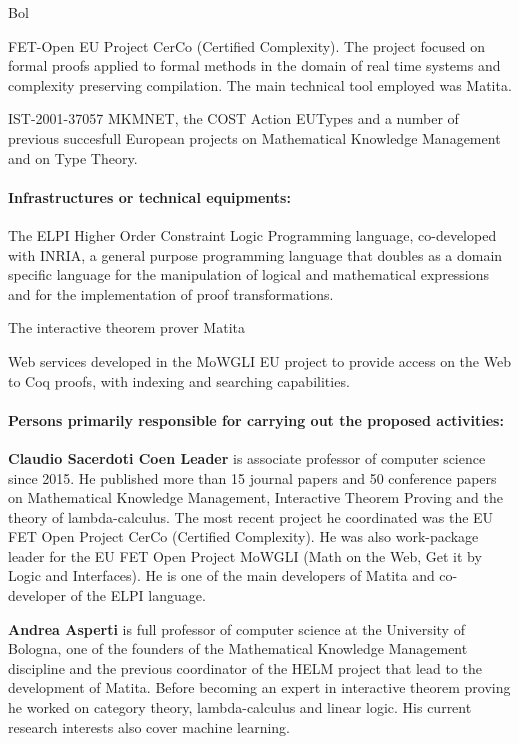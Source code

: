 \begin{sitedescription}{Bol}
\begin{compactitem}
\item FET-Open EU Project CerCo (Certified Complexity). The project focused on formal proofs applied to formal methods in the domain of real time systems and complexity preserving compilation. The main technical tool employed was Matita.

\item IST-2001-37057 MKMNET, the COST Action EUTypes and a number of previous succesfull European projects on Mathematical Knowledge Management and on Type Theory.
\end{compactitem}

\paragraph*{Infrastructures or technical equipments:}

\begin{compactitem}
\item The ELPI Higher Order Constraint Logic Programming language, co-developed with INRIA, a general purpose programming language that doubles as a domain specific language for the manipulation of logical and mathematical expressions and for the implementation of proof transformations.
\item The interactive theorem prover Matita
\item Web services developed in the MoWGLI EU project to provide access on the Web to Coq proofs, with indexing and searching capabilities.
\end{compactitem}

\paragraph*{Persons primarily responsible for carrying out the proposed activities:}

\begin{compactitem}
\item \textbf{Claudio Sacerdoti Coen Leader} is associate professor of computer science since 2015. He published more than 15 journal papers and 50 conference papers on Mathematical Knowledge Management, Interactive Theorem Proving and the theory of lambda-calculus. The most recent project he coordinated was the EU FET Open Project CerCo (Certified Complexity). He was also work-package leader for the EU FET Open Project MoWGLI (Math on the Web, Get it by Logic and Interfaces). He is one of the main developers of Matita and co-developer of the ELPI language.

\item \textbf{Andrea Asperti} is full professor of computer science at the University of Bologna, one of the founders of the Mathematical Knowledge Management discipline and the previous coordinator of the HELM project that lead to the development of Matita. Before becoming an expert in interactive theorem proving he worked on category theory, lambda-calculus and linear logic. His current research interests also cover machine learning.
\end{compactitem}

\end{sitedescription}
